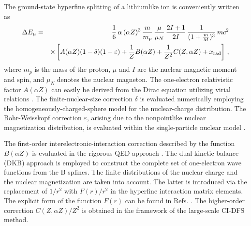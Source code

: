 \documentclass[preprint,aps,pra,showpacs,floatfix]{revtex4}
\newcommand{\veps}{\varepsilon}
\newcommand{\az}{\alpha Z}
\newcommand{\aZ}{\alpha Z}
\begin{document}
The ground-state hyperfine splitting of a lithiumlike ion is conveniently written as
%
\begin{eqnarray}
\label{eq:hfs}
  \Delta E_\mu &=& \frac{1}{6}\,\alpha\,(\aZ)^3\,\frac{m}{m_p}\,
    \frac{\mu}{\mu_N}\,\frac{2I+1}{2I}\,\frac{1}{(1+\frac{m}{M})^3}\,mc^2
\nonumber\\
  && \times
    \left[ A(\aZ)(1-\delta)(1-\veps) +
    \frac{1}{Z}B(\aZ) + \frac{1}{Z^2}C(Z,\aZ)
    + x_{\rm{rad}} \right]
\,,
\end{eqnarray}
%
where $m_p$ is the mass of the proton, $\mu$ and $I$ are the nuclear magnetic moment
and spin, and $\mu_N$ denotes the nuclear magneton. The one-electron relativistic
factor $A(\aZ)$ can easily be derived from the Dirac equation utilizing virial
relations \cite{shabaev:91}. The finite-nuclear-size correction $\delta$
is evaluated numerically employing the homogeneously-charged-sphere model
for the nuclear-charge distribution. The Bohr-Weisskopf correction $\veps$,
arising due to the nonpointlike nuclear magnetization distribution, is evaluated
within the single-particle nuclear model \cite{shabaev:94,shabaev:pra:97}.

The first-order interelectronic-interaction correction described by the function
$B(\az)$ is evaluated in the rigorous QED approach \cite{shabaeva:95}.
The dual-kinetic-balance (DKB) approach \cite{shabaev:04:prl} is employed
to construct the complete set of one-electron wave functions from
the B splines. The finite distributions of the nuclear charge and the nuclear
magnetization are taken into account. The latter is introduced via the replacement
of $1/r^2$ with $F(r)/r^2$ in the hyperfine interaction matrix elements. The explicit
form of the function $F(r)$ can be found in Refs. \cite{tup:02,zherebtsov:00}.
The higher-order correction $C(Z,\aZ)/Z^2$ is obtained in the framework of
the large-scale CI-DFS method.
\end{document}
